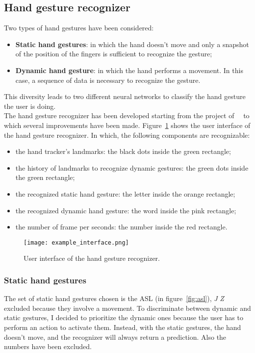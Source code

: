 \documentclass[../thesis.tex]{subfiles}
\begin{document}
\subsection{Hand gesture recognizer}
Two types of hand gestures have been considered:
\begin{itemize}
    \item \textbf{Static hand gestures}: in which the hand doesn't move and only a snapshot of the position of the fingers is sufficient to recognize the gesture;
    \item \textbf{Dynamic hand gesture}: in which the hand performs a movement. In this case, a sequence of data is necessary to recognize the gesture. 
\end{itemize}
This diversity leads to two different neural networks to classify the hand gesture the user is doing.\\
The hand gesture recognizer has been developed starting from the project of~\citeauthor{site:hand_gesture_base_repo}~\cite{site:hand_gesture_base_repo} to which several improvements have been made. Figure~\ref{fig:interface} shows the user interface of the hand gesture recognizer. In which, the following components are recognizable:
\begin{itemize}
    \item the hand tracker's landmarks: the black dots inside the green rectangle;
    \item the history of landmarks to recognize dynamic gestures: the green dots inside the green rectangle;
    \item the recognized static hand gesture: the letter inside the orange rectangle;
    \item the recognized dynamic hand gesture: the word inside the pink rectangle;
    \item the number of frame per seconds: the number inside the red rectangle.
\end{itemize}

\begin{figure}[H]
    \centering
    \texttt{[image: example\_interface.png]}
    \caption{User interface of the hand gesture recognizer.}\label{fig:interface}
\end{figure}

\subsubsection{Static hand gestures}
The set of static hand gestures chosen is the \gls{ASL} (in figure~\ref{fig:asl}), \textit{J} \textit{Z} excluded because they involve a movement. To discriminate between dynamic and static gestures, I decided to prioritize the dynamic ones because the user has to perform an action to activate them. Instead, with the static gestures, the hand doesn't move, and the recognizer will always return a prediction. Also the numbers have been excluded.
\end{document}
